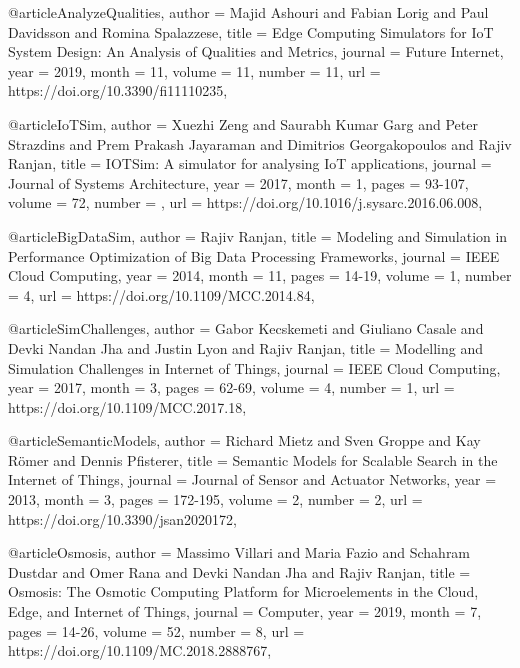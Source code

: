 \documentclass[english,version-2019-11]{uzl-thesis}
\begin{document}
\begin{bibtex-entries}
@article{AnalyzeQualities,
    author  = {Majid Ashouri and Fabian Lorig and Paul Davidsson and Romina Spalazzese},
    title   = {Edge Computing Simulators for IoT System Design: An Analysis of Qualities and Metrics},
    journal = {Future Internet},
    year    = {2019},
    month   = {11},
    volume  = {11},
    number  = {11},
    url     = {https://doi.org/10.3390/fi11110235},
}
   
@article{IoTSim,
    author  = {Xuezhi Zeng and Saurabh Kumar Garg and Peter Strazdins and Prem Prakash Jayaraman and Dimitrios Georgakopoulos and Rajiv Ranjan},
    title   = {IOTSim: A simulator for analysing IoT applications},
    journal = {Journal of Systems Architecture},
    year    = {2017},
    month = {1},
    pages   = {93-107},
    volume  = {72},
    number  = {},
    url     = {https://doi.org/10.1016/j.sysarc.2016.06.008},
}  
  
@article{BigDataSim,
    author  = {Rajiv Ranjan},
    title   = {Modeling and Simulation in Performance Optimization of Big Data Processing Frameworks}, 
    journal = {IEEE Cloud Computing},
    year    = {2014},
    month = {11},
    pages   = {14-19},
    volume  = {1},
    number  = {4},
    url     = {https://doi.org/10.1109/MCC.2014.84},
}  
 
@article{SimChallenges,
    author  = {Gabor Kecskemeti and Giuliano Casale and Devki Nandan Jha and Justin Lyon and Rajiv Ranjan},
    title   = {Modelling and Simulation Challenges in Internet of Things}, 
    journal = {IEEE Cloud Computing}, 
    year    = {2017},
    month = {3},
    pages   = {62-69},
    volume  = {4},
    number  = {1},
    url     = {https://doi.org/10.1109/MCC.2017.18},
} 
 
@article{SemanticModels,
    author  = {Richard Mietz and Sven Groppe and Kay Römer and Dennis Pfisterer},
    title   = {Semantic Models for Scalable Search in the Internet of Things}, 
    journal = {Journal of Sensor and Actuator Networks}, 
    year    = {2013},
    month = {3},
    pages   = {172-195},
    volume  = {2},
    number  = {2},
    url     = {https://doi.org/10.3390/jsan2020172},
} 
 
@article{Osmosis,
    author  = {Massimo Villari and Maria Fazio and Schahram Dustdar and Omer Rana and Devki Nandan Jha and Rajiv Ranjan},
    title   = {Osmosis: The Osmotic Computing Platform for Microelements in the Cloud, Edge, and Internet of Things}, 
    journal = {Computer}, 
    year    = {2019},
    month = {7},
    pages   = {14-26},
    volume  = {52},
    number  = {8},
    url     = {https://doi.org/10.1109/MC.2018.2888767},
}


\end{bibtex-entries}
\end{document}
